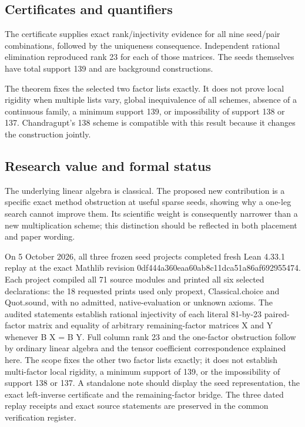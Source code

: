 \documentclass[11pt,a4paper]{article}
\begin{document}
\subsection{Certificates and quantifiers}
The certificate supplies exact rank/injectivity evidence for all nine seed/pair combinations, followed by the uniqueness consequence. Independent rational elimination reproduced rank 23 for each of those matrices. The seeds themselves have total support 139 and are background constructions.

The theorem fixes the selected two factor lists exactly. It does not prove local rigidity when multiple lists vary, global inequivalence of all schemes, absence of a continuous family, a minimum support 139, or impossibility of support 138 or 137. Chandragupt's 138 scheme is compatible with this result because it changes the construction jointly.

\subsection{Research value and formal status}
The underlying linear algebra is classical. The proposed new contribution is a specific exact method obstruction at useful sparse seeds, showing why a one-leg search cannot improve them. Its scientific weight is consequently narrower than a new multiplication scheme; this distinction should be reflected in both placement and paper wording.

On 5 October 2026, all three frozen seed projects completed fresh Lean 4.33.1 replay at the exact Mathlib revision 0df444a360eaa60ab8c11dca51a86af692955474. Each project compiled all 71 source modules and printed all six selected declarations: the 18 requested prints used only propext, Classical.choice and Quot.sound, with no admitted, native-evaluation or unknown axioms. The audited statements establish rational injectivity of each literal 81-by-23 paired-factor matrix and equality of arbitrary remaining-factor matrices X and Y whenever B X = B Y. Full column rank 23 and the one-factor obstruction follow by ordinary linear algebra and the tensor coefficient correspondence explained here. The scope fixes the other two factor lists exactly; it does not establish multi-factor local rigidity, a minimum support of 139, or the impossibility of support 138 or 137. A standalone note should display the seed representation, the exact left-inverse certificate and the remaining-factor bridge. The three dated replay receipts and exact source statements are preserved in the common verification register.
\end{document}
